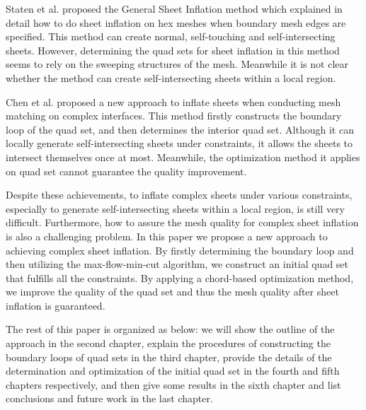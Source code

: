 \documentclass[final,5p,times,twocolumn]{elsarticle}
\begin{document}
Staten et al. proposed the General Sheet Inflation method which explained in detail how to do sheet inflation on hex meshes when boundary mesh edges are specified\cite{Staten:2009bo}. This method can create normal, self-touching and self-intersecting sheets. However, determining the quad sets for sheet inflation in this method seems to rely on the sweeping structures of the mesh. Meanwhile it is not clear whether the method can create self-intersecting sheets within a local region.

Chen et al. proposed a new approach to inflate sheets when conducting mesh matching on complex interfaces\cite{Chen:2015kf}. This method firstly constructs the boundary loop of the quad set, and then determines the interior quad set. Although it can locally generate self-intersecting sheets under constraints, it allows the sheets to intersect themselves once at most. Meanwhile, the optimization method it applies on quad set cannot guarantee the quality improvement.

Despite these achievements, to inflate complex sheets under various constraints, especially to generate self-intersecting sheets within a local region, is still very difficult. Furthermore, how to assure the mesh quality for complex sheet inflation is also a challenging problem. In this paper we propose a new approach to achieving complex sheet inflation. By firstly determining the boundary loop and then utilizing the max-flow-min-cut algorithm, we construct an initial quad set that fulfills all the constraints. By applying a chord-based optimization method, we improve the quality of the quad set and thus the mesh quality after sheet inflation is guaranteed. 

The rest of this paper is organized as below: we will show the outline of the approach in the second chapter, explain the procedures of constructing the boundary loops of quad sets in the third chapter, provide the details of the determination and optimization of the initial quad set in the fourth and fifth chapters respectively, and then give some results in the sixth chapter and list conclusions and future work in the last chapter.
\end{document}
